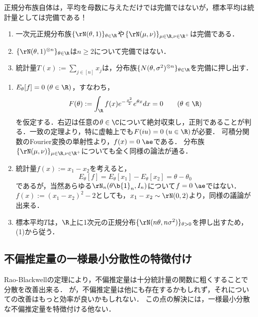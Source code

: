 \documentclass[uplatex,dvipdfmx]{jsreport}
\begin{document}
\begin{example}[正規分布族の完備性]
    正規分布族自体は，平均を母数に与えただけでは完備ではないが，標本平均は統計量としては完備である！
    \begin{enumerate}
        \item 一次元正規分布族$\{\rN(\theta,1)\}_{\theta\in\R}$や$\{\rN(\mu,\nu)\}_{\mu\in\R,\nu\in\R^+}$は完備である．
        \item $\{\rN(\theta,1)^{\otimes n}\}_{\theta\in\R}$は$n\ge2$について完備ではない．
        \item 統計量$T(x):=\sum_{j\in[n]}x_j$は，分布族$\{N(\theta,\sigma^2)^{\otimes n}\}_{\theta\in\R}$を完備に押し出す．
    \end{enumerate}
\end{example}
\begin{Proof}\mbox{}
    \begin{enumerate}
        \item $E_\theta[f]=0\;(\theta\in\R)$，すなわち，
        \[F(\theta):=\int_\R f(x)e^{-\frac{x^2}{2}}e^{\theta x}dx=0\qquad(\theta\in\R)\]
        を仮定する．右辺は任意の$\theta\in\C$について絶対収束し，正則であることが判る．一致の定理より，特に虚軸上でも$F(iu)=0\;(u\in\R)$が必要．
        可積分関数のFourier変換の単射性より，$f(x)=0\;\ae$である．
        分布族$\{\rN(\mu,\nu)\}_{\mu\in\R,\nu\in\R^+}$についても全く同様の論法が通る．
        \item 統計量$f(x):=x_1-x_2$を考えると，
        \[E_\theta[f]=E_\theta[x_1]-E_\theta[x_2]=\theta-\theta_0\]
        であるが，当然あらゆる$\rN_n(\theta\b{1}_n,I_n)$について$f=0\;\ae$ではない．
        $f(x):=(x_1-x_2)^2-2$としても，$x_1-x_2\sim\rN(0,2)$より，同様の議論が出来る．
        \item 標本平均$T$は，$\R$上に1次元の正規分布$\{\rN(n\theta,n\sigma^2)\}_{\theta>0}$を押し出すため，(1)から従う．
    \end{enumerate}
\end{Proof}

\subsection{不偏推定量の一様最小分散性の特徴付け}

\begin{tcolorbox}[colframe=ForestGreen, colback=ForestGreen!10!white,breakable,colbacktitle=ForestGreen!40!white,coltitle=black,fonttitle=\bfseries\sffamily,
title=]
    Rao-Blackwellの定理により，不偏推定量は十分統計量の関数に粗くすることで分散を改善出来る．
    が，不偏推定量は他にも存在するかもしれず，それについての改善はもっと効率が良いかもしれない．
    この点の解決には，一様最小分散な不偏推定量を特徴付ける他ない．
\end{tcolorbox}
\end{document}
